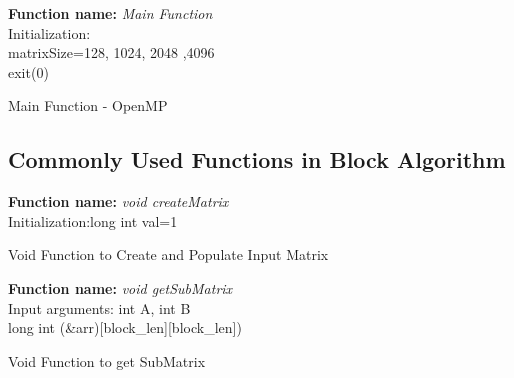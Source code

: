 \documentclass[10pt,journal]{article}
\begin{document}
\begin{algorithm}[H]
\SetAlgoLined
\textbf{Function name:} \emph{Main Function}\\\vspace{10pt}
Initialization\::\\
matrixSize={128, 1024, 2048 ,4096}\\

\vspace{10pt} 
 exit(0)
\caption{Main Function - OpenMP}
\end{algorithm}

\vspace{20pt}
\subsection{Commonly Used Functions in Block Algorithm}
\begin{algorithm}[H]
\SetAlgoLined
\textbf{Function name:} \emph{void createMatrix}\\\vspace{10pt}
Initialization\::long int val=1\\

\vspace{10pt} 
\caption{Void Function to Create and Populate Input Matrix}
\end{algorithm}

\begin{algorithm}[H]
\SetAlgoLined
\textbf{Function name:} \emph{void getSubMatrix}\\\vspace{10pt}
Input arguments:\: int A, int B\\long int (\&arr)[block\_len][block\_len])\\

\vspace{10pt} 
\caption{Void Function to get SubMatrix}
\end{algorithm}
\end{document}
